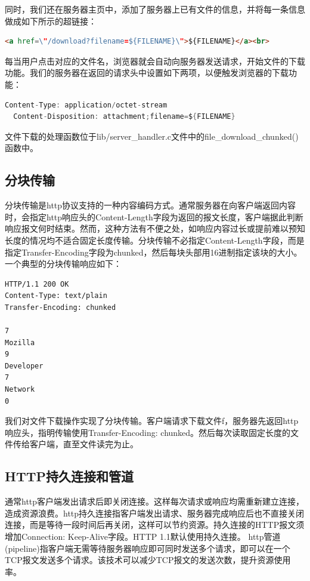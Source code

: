 \documentclass[a4paper]{article}
\begin{document}
同时，我们还在服务器主页中，添加了服务器上已有文件的信息，并将每一条信息做成如下所示的超链接：
\begin{lstlisting}[language=html]
  <a href=\"/download?filename=${FILENAME}\">${FILENAME}</a><br>
\end{lstlisting}

每当用户点击对应的文件名，浏览器就会自动向服务器发送请求，开始文件的下载功能。我们的服务器在返回的请求头中设置如下两项，以便触发浏览器的下载功能：
\begin{lstlisting}[language=C]
  Content-Type: application/octet-stream
  Content-Disposition: attachment;filename=${FILENAME}
\end{lstlisting}

文件下载的处理函数位于lib/server\_handler.c文件中的file\_download\_chunked()函数中。

\subsection{分块传输}
分块传输是http协议支持的一种内容编码方式。通常服务器在向客户端返回内容时，会指定http响应头的Content-Length字段为返回的报文长度，客户端据此判断响应报文何时结束。然而，这种方法有不便之处，如响应内容过长或提前难以预知长度的情况均不适合固定长度传输。分块传输不必指定Content-Length字段，而是指定Transfer-Encoding字段为chunked，然后每块头部用16进制指定该块的大小。一个典型的分块传输响应如下：
\begin{lstlisting}[caption = chunked encoding, label = encoding]
HTTP/1.1 200 OK
Content-Type: text/plain
Transfer-Encoding: chunked

7
Mozilla
9
Developer
7
Network
0

\end{lstlisting}

我们对文件下载操作实现了分块传输。客户端请求下载文件f，服务器先返回http响应头，指明传输使用Transfer-Encoding: chunked。然后每次读取固定长度的文件传给客户端，直至文件读完为止。


\subsection{HTTP持久连接和管道}
通常http客户端发出请求后即关闭连接。这样每次请求或响应均需重新建立连接，造成资源浪费。http持久连接指客户端发出请求、服务器完成响应后也不直接关闭连接，而是等待一段时间后再关闭，这样可以节约资源。持久连接的HTTP报文须增加Connection: Keep-Alive字段。HTTP 1.1默认使用持久连接。
http管道(pipeline)指客户端无需等待服务器响应即可同时发送多个请求，即可以在一个TCP报文发送多个请求。该技术可以减少TCP报文的发送次数，提升资源使用率。
\end{document}
